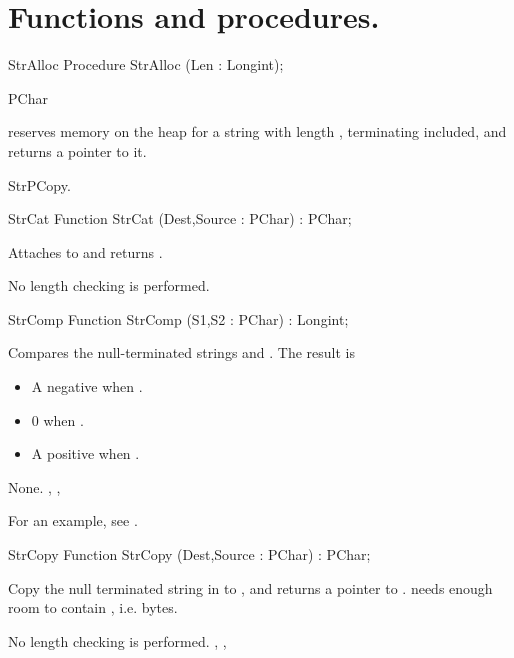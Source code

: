\section{Functions and procedures.}
\begin{procedure}{StrAlloc}
\Declaration
Procedure StrAlloc (Len : Longint);

\Description
PChar
\Errors

 reserves memory on the heap for a string with length ,
terminating  included, and returns a pointer to it.

\SeeAlso
StrPCopy.
\end{procedure}
\begin{function}{StrCat}
\Declaration
Function StrCat (Dest,Source : PChar) : PChar;

\Description

Attaches  to  and returns .

\Errors
No length checking is performed.
\SeeAlso
{}
\end{function}
\html{}
\begin{function}{StrComp}
\Declaration
Function StrComp (S1,S2 : PChar) : Longint;

\Description

Compares the null-terminated strings  and .
The result is 
\begin{itemize}
\item A negative  when .
\item 0 when .
\item A positive  when .
\end{itemize}

\Errors
None.
\SeeAlso
{}, , 
\end{function}
For an example, see .
\begin{function}{StrCopy}
\Declaration
Function StrCopy (Dest,Source : PChar) : PChar;

\Description
 
Copy the null terminated string in  to , and
returns a pointer to .  needs enough room to contain
, i.e.  bytes.

\Errors
No length checking is performed.
\SeeAlso
 , , 
\end{function}
